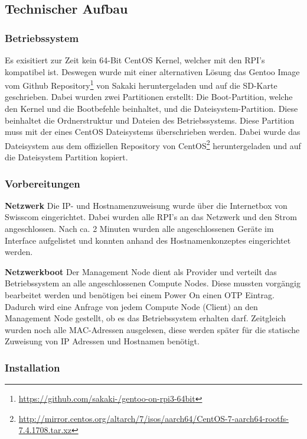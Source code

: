 \subsection{Technischer Aufbau}
\subsubsection{Betriebssystem}
Es exisitiert zur Zeit kein 64-Bit CentOS Kernel, welcher mit den RPI's kompatibel ist. Deswegen wurde mit einer alternativen Lösung das Gentoo Image vom Github Repository\footnote{\url{https://github.com/sakaki-/gentoo-on-rpi3-64bit}} von Sakaki heruntergeladen und auf die SD-Karte geschrieben. Dabei wurden zwei Partitionen erstellt: Die Boot-Partition, welche den Kernel und die Bootbefehle beinhaltet, und die Dateisystem-Partition. Diese beinhaltet die Ordnerstruktur und Dateien des Betriebssystems. Diese Partition muss mit der eines CentOS Dateisystems überschrieben werden. Dabei wurde das Dateisystem aus dem offiziellen Repository von CentOS\footnote{\url{http://mirror.centos.org/altarch/7/isos/aarch64/CentOS-7-aarch64-rootfs-7.4.1708.tar.xz}} heruntergeladen und auf die Dateisystem Partition kopiert.

\subsubsection{Vorbereitungen}
\textbf{Netzwerk}\newline
Die IP- und Hostnamenzuweisung wurde über die Internetbox von Swisscom eingerichtet. Dabei wurden alle RPI's an das Netzwerk und den Strom angeschlossen. Nach ca. 2 Minuten wurden alle angeschlossenen Geräte im Interface aufgelistet und konnten anhand des Hostnamenkonzeptes eingerichtet werden.

\textbf{Netzwerkboot}\newline
Der Management Node dient als Provider und verteilt das Betriebssystem an alle angeschlossenen Compute Nodes. Diese mussten vorgängig bearbeitet werden und benötigen bei einem Power On einen OTP Eintrag. Dadurch wird eine Anfrage von jedem Compute Node (Client) an den Management Node gestellt, ob es das Betriebssystem erhalten darf. Zeitgleich wurden noch alle MAC-Adressen ausgelesen, diese werden später für die statische Zuweisung von IP Adressen und Hostnamen benötigt.

\subsubsection{Installation}

